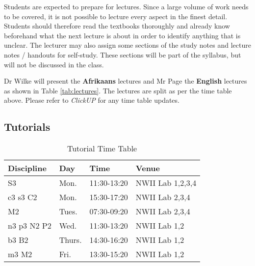         Students are expected to prepare for lectures. Since a large volume of work
        needs to be covered, it is not possible to lecture every aspect in the
        finest detail. Students should therefore read the textbooks thoroughly
        and already know beforehand what the next lecture is about in order to
        identify anything that is unclear. The lecturer may also assign some
        sections of the study notes and lecture notes / handouts for self-study.
        These sections will be part of the syllabus, but will not be discussed
        in the class.

        Dr Wilke will present the \textbf{Afrikaans} lectures and Mr
        Page the \textbf{English} lectures as shown in Table
        \ref{tab:lectures}. The lectures are split as per the time
        table above. Please refer to {\it ClickUP} for any time table
        updates.

    \subsection{Tutorials}
        \begin{table}[!h]
            \begin{center}
             \begin{tabular}{|l|l|l|l|}
               \hline
               {\bf Discipline} & {\bf Day} & {\bf Time} & {\bf Venue} \\
               \hline
               S3          & Mon.   & 11:30-13:20 & NWII Lab 1,2,3,4 \\
               c3 s3 C2    & Mon.   & 15:30-17:20 & NWII Lab 2,3,4 \\
               M2          & Tues.  & 07:30-09:20 & NWII Lab 2,3,4 \\
               n3 p3 N2 P2 & Wed.   & 11:30-13:20 & NWII Lab 1,2 \\
               b3 B2       & Thurs. & 14:30-16:20 & NWII Lab 1,2 \\
               m3 M2       & Fri.   & 13:30-15:20 & NWII Lab 1,2 \\
               \hline
             \end{tabular}

             \caption{Tutorial Time Table}
            \label{tab:tutorials}
            \end{center}
        \end{table}

